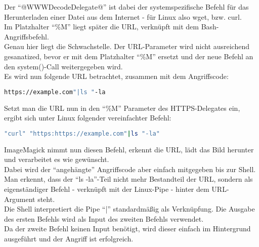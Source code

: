 Der "`@WWWDecodeDelegate@"' ist dabei der systemspezifische Befehl für das Herunterladen einer Datei aus dem Internet - für Linux also wget, bzw. curl.\\
Im Platzhalter "`\%M"' liegt später die URL, verknüpft mit dem Bash-Angriffsbefehl.\\

\newpage
Genau hier liegt die Schwachstelle.
Der URL-Parameter wird nicht ausreichend gesanatized, bevor er mit dem Platzhalter "`\%M"' ersetzt und der neue Befehl an den system()-Call weitergegeben wird.\\

Es wird nun folgende URL betrachtet, zusammen mit dem Angriffscode:

\begin{lstlisting}[firstnumber=91, language=Bash, caption=Beispielhafte URL mit Angriffscode,label={lst:lstlisting}]
https://example.com"|ls "-la
\end{lstlisting}
\vspace{5mm}

Setzt man die URL nun in den "`\%M"' Parameter des HTTPS-Delegates ein, ergibt sich unter Linux folgender vereinfachter Befehl:

\begin{lstlisting}[language=Bash, caption=HTTPS Delegate mit Angriffscode,label={lst:angriffscodedelegate}]
"curl" "https:https://example.com"|ls "-la"
\end{lstlisting}
\vspace{5mm}

ImageMagick nimmt nun diesen Befehl, erkennt die URL, lädt das Bild herunter und verarbeitet es wie gewünscht.\\

Dabei wird der "`angehängte"' Angriffscode aber einfach mitgegeben bis zur Shell.
Man erkennt, dass der "`ls -la"'-Teil nicht mehr Bestandteil der URL, sondern als eigenständiger Befehl - verknüpft mit der Linux-Pipe - hinter dem URL-Argument steht.\\

Die Shell interpretiert die Pipe "`|"' standardmäßig als Verknüpfung.
Die Ausgabe des ersten Befehls wird als Input des zweiten Befehls verwendet.\\
Da der zweite Befehl keinen Input benötigt, wird dieser einfach im Hintergrund ausgeführt und der Angriff ist erfolgreich.\\